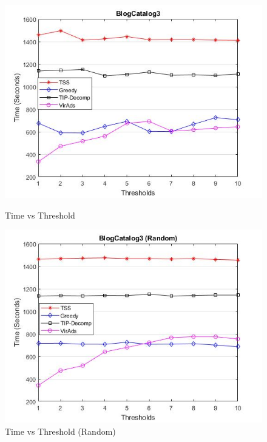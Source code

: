 \begin{figure}[h!]
\begin{minipage}[t]{0.50\textwidth}
\includegraphics[width=\linewidth,keepaspectratio=true]{images/bc3time.jpg}
\caption{Time vs Threshold}

\end{minipage}
\begin{minipage}[t]{0.50\textwidth}
\includegraphics[width=\linewidth,keepaspectratio=true]{images/bc3timerandom.jpg}
\caption{Time vs Threshold (Random)}
\end{minipage}
\end{figure}

